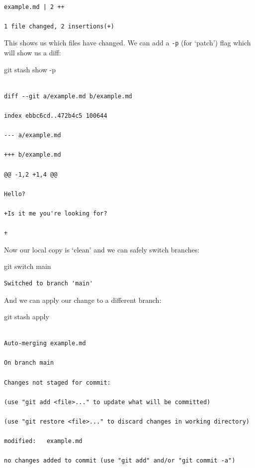 \documentclass[
  letterpaper,
  DIV=11,
  numbers=noendperiod]{scrartcl}
\newenvironment{Shaded}{\begin{snugshade}}{\end{snugshade}}
\newcommand{\AttributeTok}[1]{\textcolor[rgb]{0.40,0.45,0.13}{#1}}
\newcommand{\FunctionTok}[1]{\textcolor[rgb]{0.28,0.35,0.67}{#1}}
\newcommand{\NormalTok}[1]{\textcolor[rgb]{0.00,0.23,0.31}{#1}}
\begin{document}
\begin{verbatim}

example.md | 2 ++

1 file changed, 2 insertions(+)
\end{verbatim}

This shows us which files have changed. We can add a \texttt{-p} (for
`patch') flag which will show us a diff:

\begin{Shaded}
\begin{Highlighting}[]
\FunctionTok{git}\NormalTok{ stash show }\AttributeTok{{-}p}
\end{Highlighting}
\end{Shaded}

\begin{verbatim}

diff --git a/example.md b/example.md

index ebbc6cd..472b4c5 100644

--- a/example.md

+++ b/example.md

@@ -1,2 +1,4 @@

Hello?

+Is it me you're looking for?

+
\end{verbatim}

Now our local copy is `clean' and we can safely switch branches:

\begin{Shaded}
\begin{Highlighting}[]
\FunctionTok{git}\NormalTok{ switch main}
\end{Highlighting}
\end{Shaded}

\begin{verbatim}
Switched to branch 'main'
\end{verbatim}

And we can apply our change to a different branch:

\begin{Shaded}
\begin{Highlighting}[]
\FunctionTok{git}\NormalTok{ stash apply}
\end{Highlighting}
\end{Shaded}

\begin{verbatim}

Auto-merging example.md

On branch main

Changes not staged for commit:

(use "git add <file>..." to update what will be committed)

(use "git restore <file>..." to discard changes in working directory)

modified:   example.md

no changes added to commit (use "git add" and/or "git commit -a")
\end{verbatim}
\end{document}
